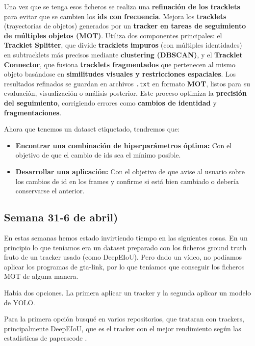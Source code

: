 \documentclass[12pt, a4paper, twoside]{article}
\begin{document}
	Una vez que se tenga esos ficheros se realiza una \textbf{refinación de los tracklets} para evitar que se cambien los \textbf{ids con frecuencia}. Mejora los \textbf{tracklets} (trayectorias de objetos) generados por un \textbf{tracker en tareas de seguimiento de múltiples objetos (MOT)}. Utiliza dos componentes principales: el \textbf{Tracklet Splitter}, que divide \textbf{tracklets impuros} (con múltiples identidades) en subtracklets más precisos mediante \textbf{clustering (DBSCAN)}, y el \textbf{Tracklet Connector}, que fusiona \textbf{tracklets fragmentados} que pertenecen al mismo objeto basándose en \textbf{similitudes visuales y restricciones espaciales}. Los resultados refinados se guardan en archivos \texttt{.txt} en formato \textbf{MOT}, listos para su evaluación, visualización o análisis posterior. Este proceso optimiza la \textbf{precisión del seguimiento}, corrigiendo errores como \textbf{cambios de identidad} y \textbf{fragmentaciones}.\vspace{0.5cm}
	
	
	Ahora que tenemos un dataset etiquetado, tendremos que:
	
	\begin{itemize}
		\item \textbf{Encontrar una combinación de hiperparámetros óptima: } Con el objetivo de que el cambio de ids sea el mínimo posible.
		\item \textbf{Desarrollar una aplicación: } Con el objetivo de que avise al usuario sobre los cambios de id en los frames y confirme si está bien cambiado o debería conservarse el anterior.
	\end{itemize}
	
	\subsection{Semana 31-6 de abril)}
	
	En estas semanas hemos estado invirtiendo tiempo en las siguientes cosas. En un principio lo que teníamos era un dataset preparado con los ficheros ground truth fruto de un tracker usado (como DeepEIoU). Pero dado un vídeo, no podíamos aplicar los programas de gta-link, por lo que teníamos que conseguir los ficheros MOT de alguna manera. 
	
	Había dos opciones. La primera aplicar un tracker y la segunda aplicar un modelo de YOLO.
	
	Para la primera opción busqué en varios repositorios, que trataran con trackers, principalmente DeepEIoU, que es el tracker con el mejor rendimiento según las estadísticas de paperscode \cite{sportsmot_paperswithcode}.
	
\end{document}
